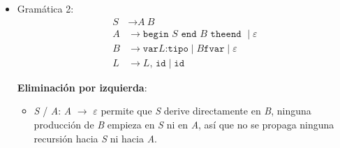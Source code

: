 \documentclass[12pt,letterpaper]{article}
\newcommand{\nt}[1]{\textit{#1}}
\newcommand{\tk}[1]{\texttt{#1}}
\newcommand{\First}[1]{\mathrm{FIRST}(#1)}
\newcommand{\eps}{\varepsilon}
\begin{document}
\begin{enumerate}[label=\arabic*.]
\begin{itemize}
    \[
    \begin{aligned}
      \First{\nt{lexp}}
      &= \First{\nt{atom}} \cup \First{\nt{list}} \\
      &= \{\tk{num},\ \tk{id}\} \cup \{\tk{(}\} \\
      &= \{\tk{num},\ \tk{id},\ \tk{(}\}
    \end{aligned}
    \]
    
    \textbf{Paso 4. \nt{lexp-seq}}\\
    La producción en EBNF es
    \[
    \nt{lexp-seq} \to \nt{lexp}\ \{\ \nt{lexp}\ \}
    \]
    Aquí ya no hay alternativas (\(\mid\)) que considerar: es una única secuencia formada por un \nt{lexp} obligatorio seguido de una repetición opcional de más \nt{lexp}. El símbolo con el que \emph{puede empezar} esta producción está determinado únicamente por el primer elemento obligatorio, es decir \nt{lexp}; la parte \(\{\ \nt{lexp}\ \}\) es opcional y por lo tanto no aporta símbolos iniciales adicionales (aunque casualmente en este caso serían los mismos, por ser el mismo no terminal repetido).

    \[
    \First{\nt{lexp-seq}} = \First{\nt{lexp}} = \{\tk{num},\ \tk{id},\ \tk{(}\}
    \]

    \textbf{Respuesta final}
    \[
    \begin{aligned}
      \First{\nt{lexp}}     &= \{\tk{num},\ \tk{id},\ \tk{(}\} \\
      \First{\nt{atom}}     &= \{\tk{num},\ \tk{id}\} \\
      \First{\nt{list}}     &= \{\tk{(}\} \\
      \First{\nt{lexp-seq}} &= \{\tk{num},\ \tk{id},\ \tk{(}\}
    \end{aligned}
    \]
    
  \item Gramática 2:
    \[
    \begin{aligned}
    \nt{S} &\to \nt{A}\ \nt{B}\\
    \nt{A} &\to \tk{begin } \nt{S } \tk{end } \nt{B } \tk{theend } \mid \eps\\
    \nt{B} &\to \tk{var} \nt{L} \tk{:} \tk{tipo} \mid \nt{B} \tk{fvar} \mid \eps\\
    \nt{L} &\to \nt{L}\tk{,} \tk{ id} \mid \tk{id}
    \end{aligned}
    \]

    \textbf{\large Eliminación por izquierda}:\\

    \begin{itemize}[leftmargin=*]
    \item \nt{S} / \nt{A}: \nt{A} $\rightarrow$ $\eps$ permite que \nt{S} derive directamente en \nt{B}, ninguna
      producción de \nt{B} empieza en \nt{S} ni en \nt{A}, así que no se propaga ninguna recursión hacia
      \nt{S} ni hacia \nt{A}.
      

\end{itemize}
\end{itemize}
\end{enumerate}
\end{document}
